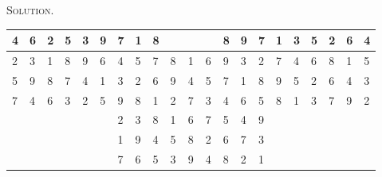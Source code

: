 \documentclass[12pt, a4paper, oneside]{article}
\newenvironment{solution}{\par\noindent\textsc{Solution. }}{\\\par}
\begin{document}
\begin{solution}
\begin{table}[]
\begin{tabular}{llllll|l|l|l|lll|l|l|l|llllll}
				\multicolumn{1}{|l|}{4} & \multicolumn{1}{l|}{6} & \multicolumn{1}{l|}{2} & \multicolumn{1}{l|}{5} & \multicolumn{1}{l|}{3} & 9 & 7 & 1 & 8 & ~                      & ~                      & ~ & 8 & 9 & 7 & \multicolumn{1}{l|}{1} & \multicolumn{1}{l|}{3} & \multicolumn{1}{l|}{5} & \multicolumn{1}{l|}{2} & \multicolumn{1}{l|}{6} & \multicolumn{1}{l|}{4} \\ \hline
				\multicolumn{1}{|l|}{2} & \multicolumn{1}{l|}{3} & \multicolumn{1}{l|}{1} & \multicolumn{1}{l|}{8} & \multicolumn{1}{l|}{9} & 6 & 4 & 5 & 7 & \multicolumn{1}{l|}{8} & \multicolumn{1}{l|}{1} & 6 & 9 & 3 & 2 & \multicolumn{1}{l|}{7} & \multicolumn{1}{l|}{4} & \multicolumn{1}{l|}{6} & \multicolumn{1}{l|}{8} & \multicolumn{1}{l|}{1} & \multicolumn{1}{l|}{5} \\ \hline
				\multicolumn{1}{|l|}{5} & \multicolumn{1}{l|}{9} & \multicolumn{1}{l|}{8} & \multicolumn{1}{l|}{7} & \multicolumn{1}{l|}{4} & 1 & 3 & 2 & 6 & \multicolumn{1}{l|}{9} & \multicolumn{1}{l|}{4} & 5 & 7 & 1 & 8 & \multicolumn{1}{l|}{9} & \multicolumn{1}{l|}{5} & \multicolumn{1}{l|}{2} & \multicolumn{1}{l|}{6} & \multicolumn{1}{l|}{4} & \multicolumn{1}{l|}{3} \\ \hline
				\multicolumn{1}{|l|}{7} & \multicolumn{1}{l|}{4} & \multicolumn{1}{l|}{6} & \multicolumn{1}{l|}{3} & \multicolumn{1}{l|}{2} & 5 & 9 & 8 & 1 & \multicolumn{1}{l|}{2} & \multicolumn{1}{l|}{7} & 3 & 4 & 6 & 5 & \multicolumn{1}{l|}{8} & \multicolumn{1}{l|}{1} & \multicolumn{1}{l|}{3} & \multicolumn{1}{l|}{7} & \multicolumn{1}{l|}{9} & \multicolumn{1}{l|}{2} \\ \hline
				~                       & ~                      & ~                      & ~                      & ~                      & ~ & 2 & 3 & 8 & \multicolumn{1}{l|}{1} & \multicolumn{1}{l|}{6} & 7 & 5 & 4 & 9 & ~                      & ~                      & ~                      & ~                      & ~                      & ~                      \\ \cline{7-15}
				~                       & ~                      & ~                      & ~                      & ~                      & ~ & 1 & 9 & 4 & \multicolumn{1}{l|}{5} & \multicolumn{1}{l|}{8} & 2 & 6 & 7 & 3 & ~                      & ~                      & ~                      & ~                      & ~                      & ~                      \\ \cline{7-15}
				~                       & ~                      & ~                      & ~                      & ~                      & ~ & 7 & 6 & 5 & \multicolumn{1}{l|}{3} & \multicolumn{1}{l|}{9} & 4 & 8 & 2 & 1 & ~                      & ~                      & ~                      & ~                      & ~                      & ~                      \\ \hline

\end{tabular}
\end{table}
\end{solution}
\end{document}
